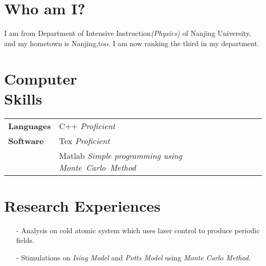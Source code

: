 \documentclass[margin]{res}
\begin{document}
\begin{resume}
\section{Who am I?}
I am from Department of Intensive Instruction\emph{(Physics)} of Nanjing University, and my hometown is Nanjing,too. I am now ranking the third in my department.
\section{Computer \\ Skills}
   \begin{tabular}{l p{4in}}
    \bf{Languages } & C++  \emph{Proficient}\\

    \bf{Software } & Tex  \emph{Proficient}\\
                   & Matlab  \emph{Simple programming using \mbox{Monte Carlo Method}}\\
 \end{tabular}

\section{Research Experiences}
  \begin{itemize} \itemsep -2pt  %
  \item [-]Analysis on cold atomic system which uses laser control to produce periodic fields.
  \item [-]Stimulations on \emph{Ising Model} and \emph{Potts Model} using \emph{Monte Carlo Method.}
 \end{itemize}

\end{resume}
\end{document}

